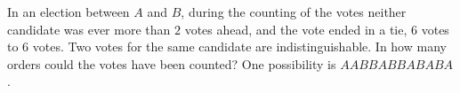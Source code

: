 In an election between $A$ and $B$, during the counting of the votes neither candidate was ever more than $2$ votes ahead, and the vote ended in a tie, $6$ votes to $6$ votes. Two votes for the same candidate are indistinguishable. In how many orders could the votes have been counted? One possibility is $AABBABBABABA$.
